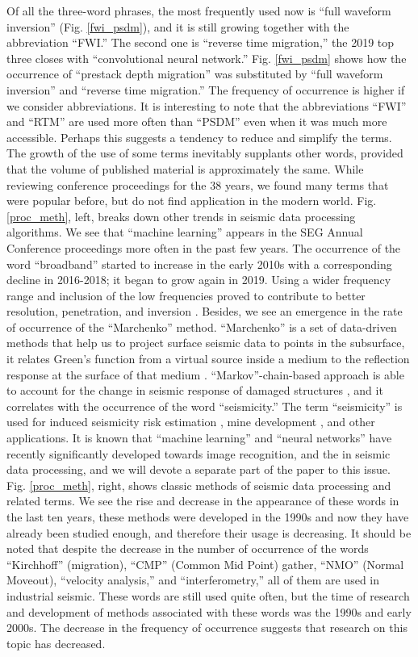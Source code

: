 \documentclass[geosciences,article,submit,moreauthors,pdftex]{Definitions/mdpi}
\begin{document}
Of all the three-word phrases, the most frequently used now is ``full waveform inversion'' (Fig. \ref{fwi_psdm}), and it is still growing together with the abbreviation ``FWI.'' The second one is ``reverse time migration,'' the 2019 top three closes with ``convolutional neural network.'' Fig. \ref{fwi_psdm} shows how the occurrence of ``prestack depth migration'' was substituted by ``full waveform inversion'' and ``reverse time migration.'' The frequency of occurrence is higher if we consider abbreviations. It is interesting to note that the abbreviations ``FWI'' and ``RTM'' are used more often than ``PSDM'' even when it was much more accessible. Perhaps this suggests a tendency to reduce and simplify the terms. The growth of the use of some terms inevitably supplants other words, provided that the volume of published material is approximately the same. While reviewing conference proceedings for the 38 years, we found many terms that were popular before, but do not find application in the modern world. 
Fig. \ref{proc_meth}, left, breaks down other trends in seismic data processing algorithms. We see that ``machine learning'' appears in the SEG Annual Conference proceedings more often in the past few years. The occurrence of the word ``broadband'' started to increase in the early 2010s with a corresponding decline in 2016-2018; it began to grow again in 2019. Using a wider frequency range and inclusion of the low frequencies proved to contribute to better resolution, penetration, and inversion \citep{Kroode2013}. Besides, we see an emergence in the rate of occurrence of the ``Marchenko'' method. ``Marchenko'' is a set of data-driven methods that help us to project surface seismic data to points in the subsurface, it relates Green’s function from a virtual source inside a medium to the reflection response at the surface of that medium \citep{Lomas2019, Thorbecke2017}. ``Markov''-chain-based approach is able to account for the change in seismic response of damaged structures \citep{Iervolino2016}, and it correlates with the occurrence of the word ``seismicity.'' The term ``seismicity'' is used for induced seismicity risk estimation \citep{Weir2018}, mine development \citep{Barthwal2018}, and other applications. It is known that ``machine learning'' and ``neural networks'' have recently significantly developed towards image recognition, and the in seismic data processing, and we will devote a separate part of the paper to this issue. Fig. \ref{proc_meth}, right, shows classic methods of seismic data processing and related terms. We see the rise and decrease in the appearance of these words in the last ten years, these methods were developed in the 1990s and now they have already been studied enough, and therefore their usage is decreasing. It should be noted that despite the decrease in the number of occurrence of the words ``Kirchhoff'' (migration), ``CMP'' (Common Mid Point) gather, ``NMO'' (Normal Moveout), ``velocity analysis,'' and ``interferometry,'' all of them are used in industrial seismic. These words are still used quite often, but the time of research and development of methods associated with these words was the 1990s and early 2000s. The decrease in the frequency of occurrence suggests that research on this topic has decreased.
\end{document}
